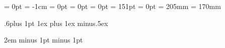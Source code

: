 %
%
\hoffset = 0pt
\voffset = -1cm
\oddsidemargin = 0pt
\oddsidemargin = 0pt
\topmargin = 0pt
\headheight = 151pt
\headsep = 0pt
\textheight = 205mm
\textwidth = 170mm

\parindent 0mm
\parskip .6\baselineskip plus 1pt
%
%
\renewcommand{\bottomfraction}{1}
\renewcommand{\topfraction}{1}
\renewcommand{\textfraction}{0}
\textfloatsep1ex plus 1ex minus.5ex
%
%
\date{}
%
%
\emergencystretch2em
 minus 1pt
 minus 1pt


%
%
%

\newcommand{\halbjahr}{{\bf Summer Semester 2009}}
\newcommand{\studiengangi}{Automotive Systems}
\newcommand{\studiengangii}{}
\newcommand{\studiengangiii}{}
\newcommand{\semesteri}{ASM-SB}
\newcommand{\semesterii}{}
\newcommand{\semesteriii}{}
\newcommand{\fach}{ Reliable Embedded Systems }
\newcommand{\lecture}{{\bf Real Time System Design }}
\newcommand{\fachnummer}{}
\newcommand{\hilfsmittel}{closed book apart from \par 2 manually written sheets of paper DIN-A4}
\newcommand{\dozent}{Friedrich}
\newcommand{\dauer}{60 minutes}

\newlength{\headerspaltenbreite}
\setlength{\headerspaltenbreite}{8.5cm}

